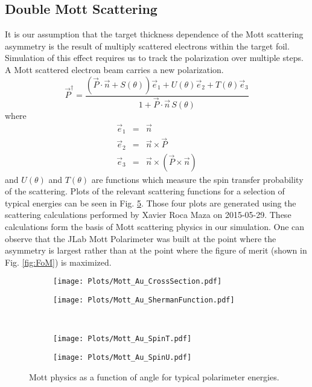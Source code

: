\documentclass[11pt]{article}
\begin{document}
\subsection{Double Mott Scattering}
It is our assumption that the target thickness dependence of the Mott scattering asymmetry is the result of multiply scattered electrons within the target foil. Simulation of this effect requires us to track the polarization over multiple steps. A Mott scattered electron beam carries a new polarization. 
\begin{equation}
 \vec{P}^\dagger = \frac{\left(\vec{P}\cdot\vec{n}+S(\theta)\right)\vec{e}_1 + U(\theta)\vec{e}_2 + T(\theta)\vec{e}_3}{1+\vec{P}\cdot\vec{n}\,S(\theta)} 
\end{equation}
where
\begin{eqnarray}
 \vec{e}_1 &=& \vec{n} \\
 \vec{e}_2 &=& \vec{n}\times\vec{P} \\
 \vec{e}_3 &=& \vec{n}\times\left(\vec{P}\times\vec{n}\right)
\end{eqnarray}
and $U(\theta)$ and $T(\theta)$ are functions which measure the spin transfer probability of the scattering. Plots of the relevant scattering functions for a selection of typical energies can be seen in Fig. \ref{fig:ScatteringFunctions}. Those four plots are generated using the scattering calculations performed by Xavier Roca Maza on 2015-05-29. These calculations form the basis of Mott scattering physics in our simulation. One can observe that the JLab Mott Polarimeter was built at the point where the asymmetry is largest rather than at the point where the figure of merit (shown in Fig. \ref{fig:FoM}) is maximized. 

\begin{figure}[!h]
\begin{subfigure}{.5\textwidth}
  \centering
  \texttt{[image: Plots/Mott\_Au\_CrossSection.pdf]}
  \label{fig:CrossSec}
\end{subfigure}
\begin{subfigure}{.5\textwidth}
  \centering
  \texttt{[image: Plots/Mott\_Au\_ShermanFunction.pdf]}
  \label{fig:ShermanFunction}
\end{subfigure}\\
\begin{subfigure}{.5\textwidth}
  \centering
  \texttt{[image: Plots/Mott\_Au\_SpinT.pdf]}
  \label{fig:SpinT}
\end{subfigure}
\begin{subfigure}{.5\textwidth}
  \centering
  \texttt{[image: Plots/Mott\_Au\_SpinU.pdf]}
  \label{fig:SpinU}
\end{subfigure}
 \caption{Mott physics as a function of angle for typical polarimeter energies.} 
\label{fig:ScatteringFunctions}
\end{figure}
\end{document}
